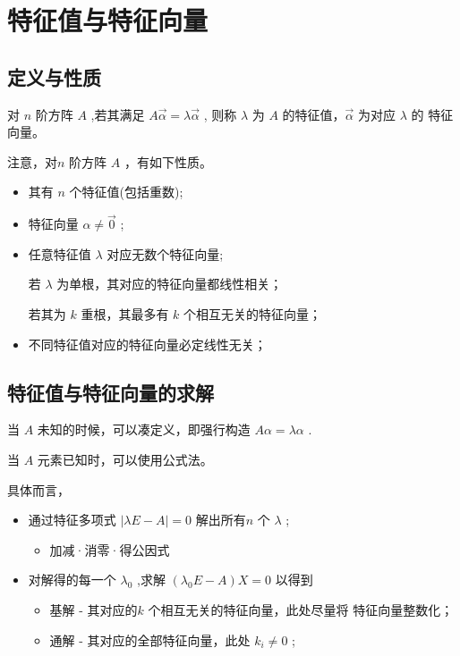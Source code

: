 \chapter{特征值与特征向量}

\section{定义与性质}

\begin{Def}[特征值与特征向量]

    对 $ n $ 阶方阵 $ A $ ,若其满足 $ A\vec\alpha = \lambda\vec\alpha $ ,
则称 $ \lambda $ 为 $ A $ 的特征值，$ \vec\alpha $ 为对应 $ \lambda $ 的
特征向量。
\end{Def}


注意，对$ n $ 阶方阵 $ A $ ，有如下性质。
\begin{itemize}
    \item 其有 $ n $ 个特征值(包括重数);
    \item 特征向量 $ \alpha \neq \vec 0 $ ;
    \item 任意特征值 $ \lambda $ 对应无数个特征向量;
    
    若 $ \lambda $ 为单根，其对应的特征向量都线性相关；

    若其为 $ k $ 重根，其最多有 $ k $ 个相互无关的特征向量；
    \item 不同特征值对应的特征向量必定线性无关；
\end{itemize}

\section{特征值与特征向量的求解}


当 $ A $ 未知的时候，可以凑定义，即强行构造 $ A\alpha = \lambda \alpha $ .


当 $ A $ 元素已知时，可以使用公式法。

具体而言，
\begin{itemize}
    \item 通过特征多项式 $ |\lambda E-A| = 0 $ 解出所有$ n $ 个 $ \lambda $ ;
    \begin{itemize}
        \item 加减·消零·得公因式
    \end{itemize}
    \item 对解得的每一个 $ \lambda_0 $ ,求解 $ (\lambda_0 E-A)X = 0 $ 
    以得到\begin{itemize}
        \item 基解 - 其对应的$ k $ 个相互无关的特征向量，此处尽量将
        特征向量整数化；
        \item 通解 - 其对应的全部特征向量，此处 $ k_i \neq 0 $ ;
    \end{itemize}
\end{itemize}


